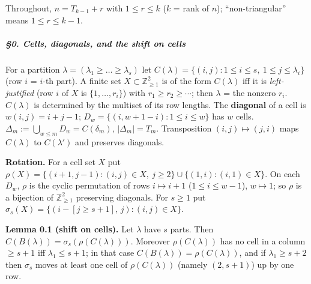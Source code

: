 \documentclass[11pt,a4paper]{article}
\begin{document}
Throughout, \(n=T_{k-1}+r\) with \(1\le r\le k\) (\(k\) = rank of
\(n\)); ``non-triangular'' means \(1\le r\le k-1\).

\subparagraph{§0. Cells, diagonals, and the shift on
cells}\label{cells-diagonals-and-the-shift-on-cells}

For a partition \(\lambda=(\lambda_1\ge\dots\ge\lambda_s)\) let
\(C(\lambda)=\{(i,j):1\le i\le s,\ 1\le j\le\lambda_i\}\) (row \(i\) =
\(i\)-th part). A finite set \(X\subset\mathbb Z_{\ge1}^2\) is of the
form \(C(\lambda)\) iff it is \emph{left-justified} (row \(i\) of \(X\)
is \(\{1,\dots,r_i\}\)) with \(r_1\ge r_2\ge\cdots\); then \(\lambda\) =
the nonzero \(r_i\). \(C(\lambda)\) is determined by the multiset of its
row lengths. The \textbf{diagonal} of a cell is \(w(i,j)=i+j-1\);
\(D_w=\{(i,w+1-i):1\le i\le w\}\) has \(w\) cells.
\(\Delta_m:=\bigcup_{w\le m}D_w=C(\delta_m)\), \(|\Delta_m|=T_m\).
Transposition \((i,j)\mapsto(j,i)\) maps \(C(\lambda)\) to
\(C(\lambda')\) and preserves diagonals.

\textbf{Rotation.} For a cell set \(X\) put
\(\rho(X)=\{(i+1,j-1):(i,j)\in X,\ j\ge2\}\cup\{(1,i):(i,1)\in X\}\). On
each \(D_w\), \(\rho\) is the cyclic permutation of rows
\(i\mapsto i+1\) (\(1\le i\le w-1\)), \(w\mapsto1\); so \(\rho\) is a
bijection of \(\mathbb Z_{\ge1}^2\) preserving diagonals. For \(s\ge1\)
put \(\sigma_s(X)=\{(i-[j\ge s+1],\,j):(i,j)\in X\}\).

\textbf{Lemma 0.1 (shift on cells).} Let \(\lambda\) have \(s\) parts.
Then \(C(B(\lambda))=\sigma_s(\rho(C(\lambda)))\). Moreover
\(\rho(C(\lambda))\) has no cell in a column \(\ge s+1\) iff
\(\lambda_1\le s+1\); in that case \(C(B(\lambda))=\rho(C(\lambda))\),
and if \(\lambda_1\ge s+2\) then \(\sigma_s\) moves at least one cell of
\(\rho(C(\lambda))\) (namely \((2,s+1)\)) up by one row.
\end{document}
